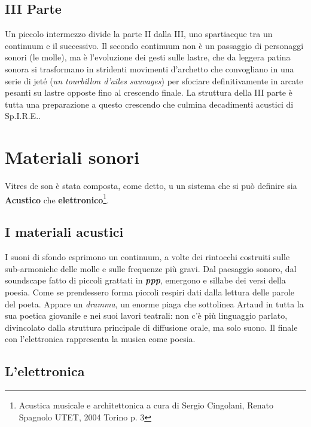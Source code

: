 
\subsection*{III Parte}

Un piccolo intermezzo divide la parte II dalla III, uno spartiacque tra un continuum  e il successivo. Il secondo continuum non è un passaggio di personaggi sonori (le molle), ma è l'evoluzione dei gesti sulle lastre, che da leggera patina sonora si trasformano in stridenti movimenti d'archetto che convogliano in una serie di jeté (\textit{un tourbillon d'ailes sauvages}) per sfociare definitivamente in arcate pesanti su lastre opposte fino al crescendo finale. La struttura della III parte è tutta una preparazione a questo crescendo che culmina decadimenti acustici di Sp.I.R.E..


\section{Materiali sonori}

Vitres de son è stata composta, come detto, u un sistema che si può definire sia \textbf{Acustico} che \textbf{elettronico}\footnote{Acustica musicale e architettonica a cura di Sergio Cingolani, Renato Spagnolo UTET, 2004 Torino p. 3}.

\subsection*{I materiali acustici}

I suoni di sfondo esprimono un continuum, a volte dei rintocchi costruiti sulle sub-armoniche delle molle e sulle frequenze più gravi. Dal paesaggio sonoro, dal soundscape fatto di piccoli grattati in \textbf{\textit{ppp}}, emergono e sillabe dei versi della poesia. Come se prendessero forma piccoli respiri dati dalla lettura delle parole del poeta. Appare un \textit{dramma}, un enorme piaga che sottolinea Artaud in tutta la sua poetica giovanile e nei suoi lavori teatrali: non c'è più linguaggio parlato, divincolato dalla struttura principale di diffusione orale, ma solo suono. Il finale con l'elettronica rappresenta la musica come poesia.

\subsection*{L'elettronica}

